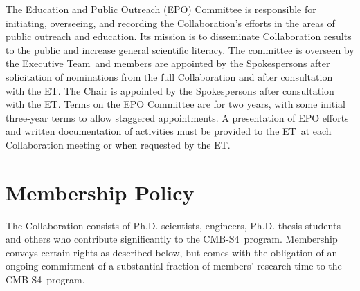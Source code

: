 \documentclass[12pt]{article}
\newcommand{\exec}{{Executive Team}}
\newcommand{\shorte}{{ET}}  %
\newcommand\collabname{CMB-S4}
\begin{document}
The Education and Public Outreach (EPO) Committee is responsible for initiating, overseeing, and recording the Collaboration's efforts in the areas of public outreach and education. Its mission is to disseminate Collaboration results to the public and increase general scientific literacy. The committee is overseen by the \exec \ and members are appointed by the  \textcolor{\markcolor}{Spokespersons %
} after solicitation of nominations from the full Collaboration \textcolor{\markcolor}{ and after consultation with the \shorte.}
 The Chair is appointed by the Spokespersons \textcolor{\markcolor}{ after consultation with the \shorte.}  Terms on the EPO Committee are for two years, with some initial three-year terms to allow staggered appointments.   A presentation of EPO efforts and written documentation of activities must be provided to the \shorte\ at each Collaboration meeting or when requested by the \shorte. 

\section{Membership Policy}

The Collaboration consists of Ph.D. scientists, engineers, Ph.D. thesis students %
and others who contribute significantly to the \collabname\ program. Membership conveys certain rights as described below, but comes with the obligation of an ongoing commitment of a substantial fraction of members' research time to the \collabname\ program.

\vspace{0.2in}
\noindent


\end{document}
